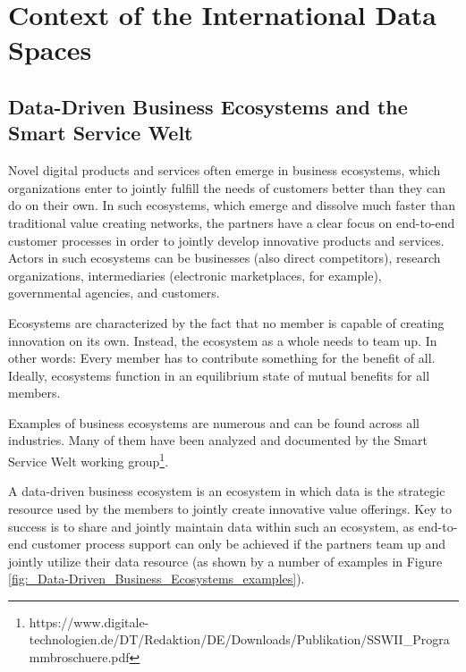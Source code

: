 
\section{Context of the International Data Spaces}\label{sec:context}
\subsection{Data-Driven Business Ecosystems and the Smart Service Welt}\label{subsec:data_driven_business_ecosystems}
Novel digital products and services often emerge in business ecosystems, which organizations enter to jointly fulfill the needs of customers better than they can do on their own. In such ecosystems, which emerge and dissolve much faster than traditional value creating networks, the partners have a clear focus on end-to-end customer processes in order to jointly develop innovative products and services. Actors in such ecosystems can be businesses (also direct competitors), research organizations, intermediaries (electronic marketplaces, for example), governmental agencies, and customers.

Ecosystems are characterized by the fact that no member is capable of creating innovation on its own. Instead, the ecosystem as a whole needs to team up. In other words: Every member has to contribute something for the benefit of all. Ideally, ecosystems function in an equilibrium state of mutual benefits for all members.

Examples of business ecosystems are numerous and can be found across all industries. Many of them have been analyzed and documented by the Smart Service Welt working group\footnote{ https://www.digitale-technologien.de/DT/Redaktion/DE/Downloads/Publikation/SSWII\_Programmbroschuere.pdf }.

A data-driven business ecosystem is an ecosystem in which data is the strategic resource used by the members to jointly create innovative value offerings. Key to success is to share and jointly maintain data within such an ecosystem, as end-to-end customer process support can only be achieved if the partners team up and jointly utilize their data resource (as shown by a number of examples in Figure \ref{fig:_Data-Driven_Business_Ecosystems_examples}).



